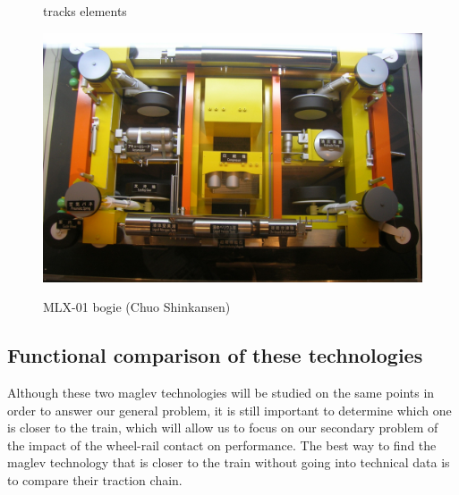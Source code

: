 \documentclass[12pt, a4paper, onecolumn]{article}
\renewcommand{\tab}{\tabto{15px}}
\begin{document}
\begin{figure}[H]
\begin{minipage}{.48\linewidth}
    \caption{tracks elements}
    \label{schemaEDS}
    \includegraphics[width=\textwidth]{img/bogieLSM.jpg}
    \caption{MLX-01 bogie (Chuo Shinkansen)}
    \label{bogieLSM}
  \end{minipage}
\end{figure}



\pagebreak %
\subsection*{Functional comparison of these technologies}

\tab Although these two maglev technologies will be studied on the same points in order to answer our general problem, it is still important to determine which one is closer to the train, which will allow us to focus on our secondary problem of the impact of the wheel-rail contact on performance.
The best way to find the maglev technology that is closer to the train without going into technical data is to compare their traction chain. \\
\end{document}
